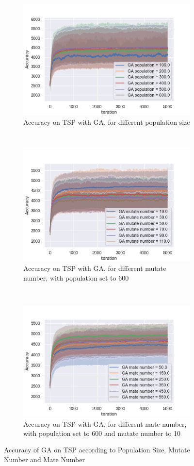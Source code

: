 \documentclass[twocolumn, 10pt]{article}
\begin{document}
				\begin{figure}[h]
					\centering
					\begin{subfigure}[t]{\columnwidth}
						\centering
						\includegraphics[width=0.68\linewidth]{../graphics/tsp_GA_Iteration_Error_GA_population.png}
						\caption{Accuracy on TSP with GA, for different population size}
						\label{tsp:ga_pop}
					\end{subfigure}
					~
					\begin{subfigure}[t]{\columnwidth}
						\centering
						\includegraphics[width=0.68\linewidth]{../graphics/tsp_GA_Iteration_Error_GA_mutate_number.png}
						\caption{Accuracy on TSP with GA, for different mutate number, with population set to 600}
						\label{tsp:ga_mutate}
					\end{subfigure}
					~
					\begin{subfigure}[t]{\columnwidth}
						\centering
						\includegraphics[width=0.68\linewidth]{../graphics/tsp_GA_Iteration_Error_GA_mate_number.png}
						\caption{Accuracy on TSP with GA, for different mate number, with population set to 600 and mutate number to 10}
						\label{tsp:ga_mate}
					\end{subfigure}
					\caption{Accuracy of GA on TSP according to Population Size, Mutate Number and Mate Number}
					\label{tsp:ga}
				\end{figure}
\end{document}
